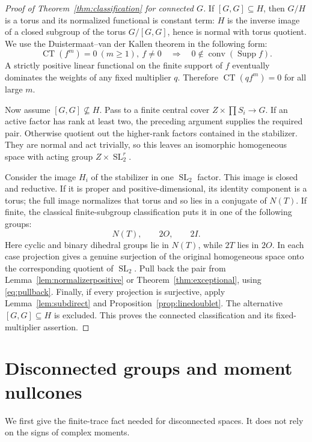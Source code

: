 \documentclass[11pt]{article}
\numberwithin{equation}{section}
\theoremstyle{definition}
\theoremstyle{remark}
\newcommand{\CT}{\operatorname{CT}}
\newcommand{\SL}{\operatorname{SL}}
\newcommand{\Supp}{\operatorname{Supp}}
\newcommand{\conv}{\operatorname{conv}}
\begin{document}
\begin{proof}[Proof of Theorem~\ref{thm:classification} for connected $G$]
If $[G,G]\subseteq H$, then $G/H$ is a torus and its normalized
functional is constant term: $H$ is the inverse image of a closed
subgroup of the torus $G/[G,G]$, hence is normal with torus quotient.
We use the Duistermaat--van der Kallen
theorem \cite[pp.~222--224]{DvK} in the following form:
\begin{equation}\label{eq:dvk}
 \CT(f^m)=0\ (m\geq1),\ f\ne0
 \quad\Longrightarrow\quad0\notin\conv(\Supp f).
\end{equation}
A strictly positive linear functional on the finite support of $f$
eventually dominates the weights of any fixed multiplier $q$.
Therefore $\CT(qf^m)=0$ for all large $m$.

Now assume $[G,G]\not\subseteq H$. Pass to a finite central cover
$Z\times\prod S_i\to G$. If an active factor has rank at least two,
the preceding argument supplies the required pair. Otherwise quotient
out the higher-rank factors contained in the stabilizer. They are normal
and act trivially, so this leaves an isomorphic homogeneous space with
acting group $Z\times\SL_2^r$.

Consider the image $H_i$ of the stabilizer in one $\SL_2$ factor.
This image is closed and reductive. If it is proper and positive-dimensional,
its identity component is a torus; the full image normalizes that torus
and so lies in a conjugate of $N(T)$. If finite, the classical finite-subgroup classification
\cite[p.~215]{Flicker} puts it in one of the following groups:
\[
 N(T),\qquad 2O,\qquad 2I.
\]
Here cyclic and binary dihedral groups lie in $N(T)$, while $2T$ lies
in $2O$. In each case projection gives a genuine surjection of the
original homogeneous space onto the corresponding quotient of $\SL_2$.
Pull back the pair from Lemma~\ref{lem:normalizerpositive} or
Theorem~\ref{thm:exceptional}, using \eqref{eq:pullback}.
Finally, if every projection is surjective, apply
Lemma~\ref{lem:subdirect} and Proposition~\ref{prop:linedoublet}.
The alternative $[G,G]\subseteq H$ is excluded. This proves the
connected classification and its fixed-multiplier assertion.
\end{proof}

\section{Disconnected groups and moment nullcones}\label{sec:components}

We first give the finite-trace fact needed for disconnected spaces.
It does not rely on the signs of complex moments.
\end{document}
